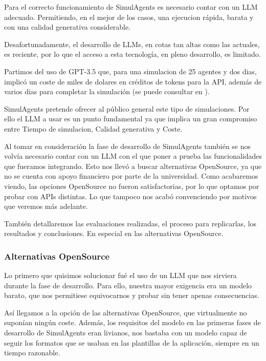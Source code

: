 Para el correcto funcionamiento de SimulAgents es necesario contar con un LLM adecuado. Permitiendo, en el mejor de los casos, una ejecucion rápida, barata y con una calidad generativa considerable.

Desafortunadamente, el desarrollo de LLMs, en cotas tan altas como las actuales, es reciente, por lo que el acceso a esta tecnología, en pleno desarrollo, es limitado.

Partimos del uso de GPT-3.5 que, para una simulacion de 25 agentes y dos dias, implicó un coste de miles de dolares en créditos de tokens para la API, además de varios dias para completar la simulación (se puede consultar en \cite{park2023generative}).

SimulAgents pretende ofrecer al público general este tipo de simulaciones.
Por ello el LLM a usar es un punto fundamental ya que implica un gran compromiso entre Tiempo de simulacion, Calidad generativa y Coste.

Al tomar en consideración la fase de desarrollo de SimulAgents también se nos volvía necesario contar con un LLM con el que poner a prueba las funcionalidades que fueramos integrando.
Esto nos llevó a buscar alternativas OpenSource, ya que no se cuenta con apoyo financiero por parte de la universidad.
Como acabaremos viendo, las opciones OpenSource no fueron satisfactorias, por lo que optamos por probar con APIs distintas. Lo que tampoco nos acabó convenciendo por motivos que veremos más adelante.

También detallaremos las evaluaciones realizadas, el proceso para replicarlas, los resultados y conclusiones. En especial en las alternativas OpenSource.

\subsubsection{Alternativas OpenSource}

Lo primero que quisimos solucionar fué el uso de un LLM que nos sirviera durante la fase de desarrollo. Para ello, nuestra mayor exigencia era un modelo barato, que nos permitiese equivocarnos y probar sin tener apenas consecuencias.

Así llegamos a la opción de las alternativas OpenSource, que virtualmente no suponían ningún coste. 
Además, los requisitos del modelo en las primeras fases de desarrollo de SimulAgents eran livianos, nos bastaba con un modelo capaz de seguir los formatos que se usaban en las plantillas de la aplicación, siempre en un tiempo razonable.

